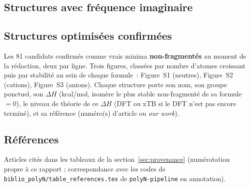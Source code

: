 \documentclass[11pt,a4paper]{article}
\begin{document}


\subsection{Structures avec fr\'equence imaginaire}
\label{sec:si-imaginary}



\subsection{Structures optimis\'ees confirm\'ees}
\label{sec:si-confirmed}

Les 81 candidats confirm\'es comme vrais minima \textbf{non-fragment\'es}
au moment de la r\'edaction, deux par ligne. Trois figures, class\'ees
par nombre d'atomes croissant puis par stabilit\'e au sein de chaque
formule~: Figure~S1 (neutres), Figure~S2 (cations), Figure~S3 (anions).
Chaque structure porte son nom, son groupe ponctuel, son $\Delta H$
(kcal/mol, isom\`ere le plus stable non-fragment\'e de sa formule $=0$),
le niveau de th\'eorie de ce $\Delta H$ (DFT ou xTB si le DFT n'est pas
encore termin\'e), et sa r\'ef\'erence (num\'ero(s) d'article ou
\emph{our work}).



\clearpage
\subsection{R\'ef\'erences}

Articles cit\'es dans les tableaux de la section~\ref{sec:provenance}
(num\'erotation propre \`a ce rapport ; correspondance avec les codes de
\texttt{biblio\_polyN/table\_references.tex} de \texttt{polyN-pipeline}
en annotation).


\end{document}
